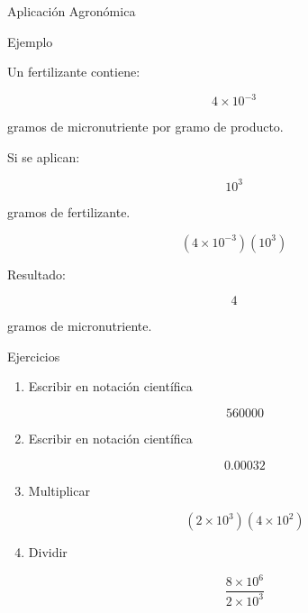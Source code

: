 \documentclass[aspectratio=169,10pt,handout]{beamer}
\newcommand{\pp}{\pause}
\begin{document}
	\begin{frame}{Aplicación Agronómica}
		
		\begin{block}{Ejemplo}
			
			Un fertilizante contiene:
			
			\[
			4\times10^{-3}
			\]
			
			gramos de micronutriente por gramo de producto.
			
		\end{block}
		
		\pp
		
		Si se aplican:
		
		\[
		10^3
		\]
		
		gramos de fertilizante.
		
		\pp
		
		\[
		(4\times10^{-3})(10^3)
		\]
		
		\pp
		
		Resultado:
		
		\[
		4
		\]
		
		gramos de micronutriente.
		
	\end{frame}
	
	\begin{frame}{Ejercicios}
		
		\begin{enumerate}
			
			\item Escribir en notación científica
			
			\[
			560000
			\]
			
			\item Escribir en notación científica
			
			\[
			0.00032
			\]
			
			\item Multiplicar
			
			\[
			(2\times10^3)(4\times10^2)
			\]
			
			\item Dividir
			
			\[
			\frac{8\times10^6}{2\times10^3}
			\]
			
		\end{enumerate}
		
	\end{frame}
	
\end{document}
